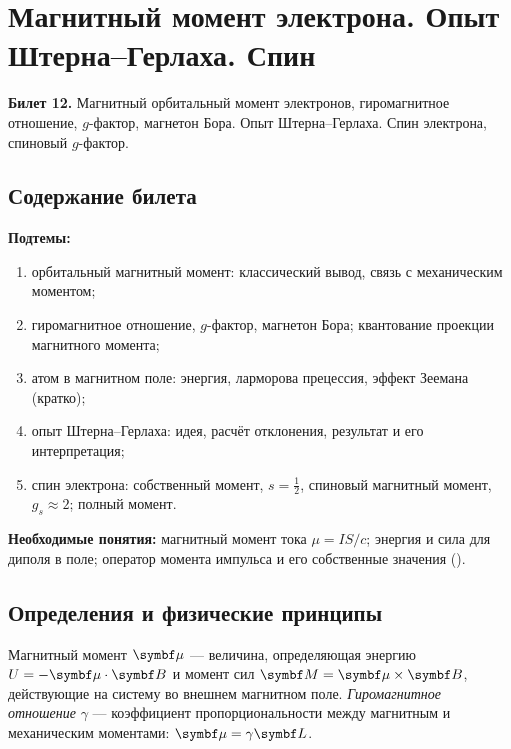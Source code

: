 \chapter[Магнитный момент. Опыт Штерна--Герлаха. Спин]%
        {Магнитный момент электрона. Опыт Штерна--Герлаха. Спин}
\label{t:12}

\begin{qbox}
\textbf{Билет 12.} Магнитный орбитальный момент электронов, гиромагнитное отношение, $g$-фактор,
магнетон Бора. Опыт Штерна--Герлаха. Спин электрона, спиновый $g$-фактор.
\end{qbox}

\section{Содержание билета}

\textbf{Подтемы:}
\begin{enumerate}
 \item орбитальный магнитный момент: классический вывод, связь с механическим моментом;
 \item гиромагнитное отношение, $g$-фактор, магнетон Бора; квантование проекции магнитного момента;
 \item атом в магнитном поле: энергия, ларморова прецессия, эффект Зеемана (кратко);
 \item опыт Штерна--Герлаха: идея, расчёт отклонения, результат и его интерпретация;
 \item спин электрона: собственный момент, $s=\frac12$, спиновый магнитный момент, $g_s\approx2$; полный момент.
\end{enumerate}

\textbf{Необходимые понятия:} магнитный момент тока $\mu=IS/c$; энергия и сила для диполя в
поле; оператор момента импульса и его собственные значения ().

\section{Определения и физические принципы}

\begin{definition}
Магнитный момент $\vect\mu$ — величина, определяющая энергию $U=-\vect\mu\cdot\vect B$ и момент сил
$\vect M=\vect\mu\times\vect B$, действующие на систему во внешнем магнитном поле. \emph{Гиромагнитное
отношение} $\gamma$ — коэффициент пропорциональности между магнитным и механическим моментами:
$\vect\mu=\gamma\vect L$.
\end{definition}

